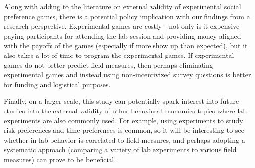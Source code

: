 \documentclass[12pt]{article}
\begin{document}
Along with adding to the literature on external validity of experimental social preference games, there is a potential policy implication with our findings from a research perspective. Experimental games are costly - not only is it expensive paying participants for attending the lab session and providing money aligned with the payoffs of the games (especially if more show up than expected), but it also takes a lot of time to program the experimental games. If experimental games do not better predict field measures, then perhaps eliminating experimental games and instead using non-incentivized survey questions is better for funding and logistical purposes. 

Finally, on a larger scale, this study can potentially spark interest into future studies into the external validity of other behavioral economics topics where lab experiments are also commonly used. For example, using experiments to study risk preferences and time preferences is common, so it will be interesting to see whether in-lab behavior is correlated to field measures, and perhaps adopting a systematic approach (comparing a variety of lab experiments to various field measures) can prove to be beneficial.
 \newpage
\end{document}
